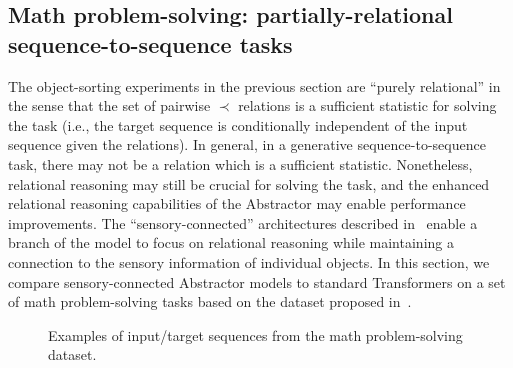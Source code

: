 \subsection{Math problem-solving: partially-relational sequence-to-sequence tasks}\label{ssec:experiments_math}

The object-sorting experiments in the previous section are ``purely relational'' in the sense that the set of pairwise $\prec$ relations is a sufficient statistic for solving the task (i.e., the target sequence is conditionally independent of the input sequence given the relations). In general, in a generative sequence-to-sequence task, there may not be a relation which is a sufficient statistic. Nonetheless, relational reasoning may still be crucial for solving the task, and the enhanced relational reasoning capabilities of the Abstractor may enable performance improvements. The ``sensory-connected'' architectures described in~ enable a branch of the model to focus on relational reasoning while maintaining a connection to the sensory information of individual objects. In this section, we compare sensory-connected Abstractor models to standard Transformers on a set of math problem-solving tasks based on the dataset proposed in~\citep{saxtonAnalyzingMathematicalReasoning2019}.

\begin{figure}
    \begin{center}
    \end{center}
\caption{Examples of input/target sequences from the math problem-solving dataset.}\label{fig:math_dataset}
\end{figure}

